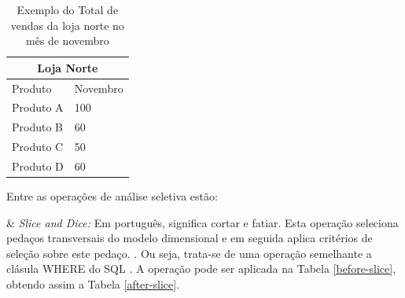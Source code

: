 \begin{table}[!ht]
\centering
\begin{tabular}{|l|l|}
\hline
\multicolumn{2}{|c|}{Loja Norte} \\ \hline
\cline{1-2}
Produto         & Novembro       \\ \hline
Produto A & 100 \\ \hline
Produto B & 60  \\ \hline
Produto C & 50  \\ \hline
Produto D & 60  \\ \hline

\end{tabular}
\caption{Exemplo do Total de vendas da loja norte no mês de novembro}
\label{after-across}
\end{table}
\FloatBarrier

Entre as operações de análise seletiva estão:

\begin{easylist}[itemize]

& \textit{Slice and Dice:} Em português, significa cortar e fatiar. Esta operação seleciona pedaços transversais do modelo dimensional e em seguida aplica critérios de seleção sobre este pedaço. \cite{andre2000}. Ou seja, trata-se de uma operação semelhante a clásula WHERE do SQL \cite{valeria2012}. A operação pode ser aplicada na Tabela \ref{before-slice}, obtendo assim a Tabela \ref{after-slice}.


\end{easylist}

